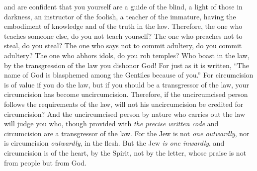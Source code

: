 \begin{biblechapter}
\verse and are confident that you yourself are a guide of the blind, a light of those in darkness,
\verse an instructor of the foolish, a teacher of the immature, having the embodiment of knowledge and of the truth in the law.
\verse Therefore, the one who teaches someone else, do you not teach yourself? The one who preaches not to steal, do you steal?
\verse The one who says not to commit adultery, do you commit adultery? The one who abhors idols, do you rob temples?
\verse Who boast in the law, by the transgression of the law you dishonor God!
\verse For just as it is written, “The name of God is blasphemed among the Gentiles because of you.”
\verse For circumcision is of value if you do the law, but if you should be a transgressor of the law, your circumcision has become uncircumcision.
\verse Therefore, if the uncircumcised person follows the requirements of the law, will not his uncircumcision be credited for circumcision?
\verse And the uncircumcised person by nature who carries out the law will judge you who, though provided with \textit{the precise written code} and circumcision are a transgressor of the law.
\verse For the Jew is not \textit{one outwardly}, nor is circumcision \textit{outwardly}, in the flesh.
\verse But the Jew \textit{is one inwardly}, and circumcision is of the heart, by the Spirit, not by the letter, whose praise is not from people but from God.
\end{biblechapter}

